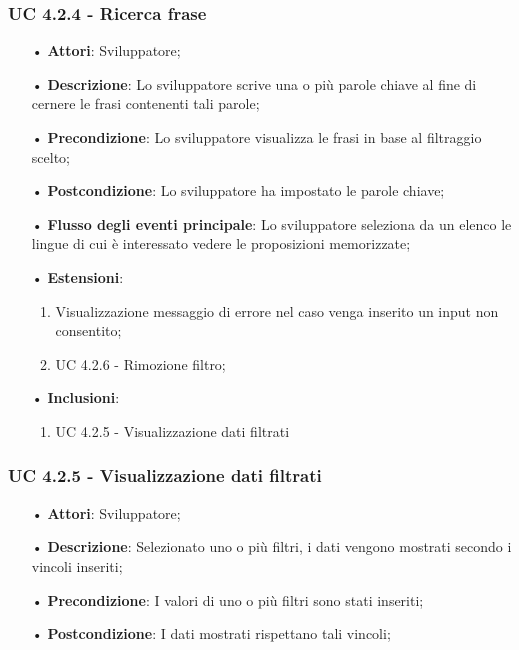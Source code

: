 \subsubsection{UC 4.2.4 - Ricerca frase}
\begin{itemize}
\item[•]\textbf{Attori}: Sviluppatore;
\item[•]\textbf{Descrizione}: Lo sviluppatore scrive una o più parole chiave al fine di cernere le frasi contenenti tali parole;
\item[•]\textbf{Precondizione}: Lo sviluppatore visualizza le frasi in base al filtraggio scelto;
\item[•]\textbf{Postcondizione}: Lo sviluppatore ha impostato le parole chiave;
\item[•]\textbf{Flusso degli eventi principale}: Lo sviluppatore seleziona da un elenco le lingue di cui è interessato vedere le proposizioni memorizzate;
\item[•]\textbf{Estensioni}: 
\begin{enumerate}
	\item Visualizzazione messaggio di errore nel caso venga inserito un input non consentito;
	\item UC 4.2.6 - Rimozione filtro;
\end{enumerate}
\item[•]\textbf{Inclusioni}:
\begin{enumerate}
\item UC 4.2.5 - Visualizzazione dati filtrati
\end{enumerate}
\end{itemize}

\subsubsection{UC 4.2.5 - Visualizzazione dati filtrati}
\begin{itemize}
\item[•]\textbf{Attori}: Sviluppatore;
\item[•]\textbf{Descrizione}: Selezionato uno o più filtri, i dati vengono mostrati secondo i vincoli inseriti;
\item[•]\textbf{Precondizione}: I valori di uno o più filtri sono stati inseriti;
\item[•]\textbf{Postcondizione}: I dati mostrati rispettano tali vincoli;
\end{itemize}

